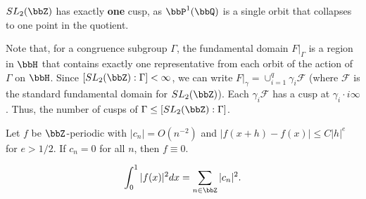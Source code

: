 \begin{corollary}
    $SL_2(\bbZ)$ has exactly \textbf{one} cusp, as $\bbP^1(\bbQ)$ is a single orbit that collapses to one point in the quotient.
\end{corollary}

Note that, for a congruence subgroup $\Gamma$, the fundamental domain $F|_{\Gamma}$ is a region in $\bbH$ that contains exactly one representative from each orbit of the action of $\Gamma$ on $\bbH$. Since $[SL_2(\bbZ):\Gamma]<\infty$, we can write $F|_{\gamma}=\cup_{i=1}^q \gamma_i \mathcal F$ (where $\mathcal F$ is the standard fundamental domain for $SL_2(\bbZ)$). Each $\gamma_i \mathcal F$ has a cusp at $\gamma_i \cdot i\infty$. Thus, the number of cusps of $\Gamma \leq [SL_2(\bbZ):\Gamma]$.



\begin{lemma}
Let $f$ be $\bbZ$-periodic with $|c_n|=O(n^{-2})$ and $|f(x+h)-f(x)|\le C|h|^e$ for $e>1/2$.  
If $c_n=0$ for all $n$, then $f\equiv 0$.
\end{lemma}

\begin{lemma}[Parseval]
\[
\int_0^1 |f(x)|^2 dx=\sum_{n\in\bbZ}|c_n|^2.
\]
\end{lemma}

